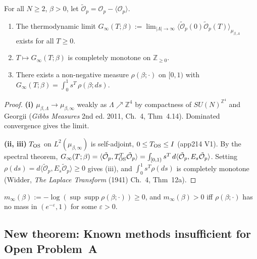 \begin{theorem}
\label{thm:inf_vol_cm}
For all $N\ge 2$, $\beta>0$, let
$\tilde{\mathcal{O}}_p=\mathcal{O}_p-\langle\mathcal{O}_p\rangle$.
\begin{enumerate}
\item[\rm(i)] The thermodynamic limit
  $G_\infty(T;\beta):=\lim_{|\Lambda|\to\infty}
  \langle\tilde{\mathcal{O}}_p(0)\tilde{\mathcal{O}}_p(T)\rangle_{\mu_{\beta,\Lambda}}$
  exists for all $T\ge 0$.
\item[\rm(ii)] $T\mapsto G_\infty(T;\beta)$ is completely monotone on $\mathbb{Z}_{\ge 0}$.
\item[\rm(iii)] There exists a non-negative measure $\rho(\beta;\cdot)$ on $[0,1)$ with
  $G_\infty(T;\beta)=\int_0^1 s^T\,\rho(\beta;ds)$.
\end{enumerate}
\end{theorem}
\begin{proof}
\textbf{(i)} $\mu_{\beta,\Lambda}\to\mu_{\beta,\infty}$ weakly as $\Lambda\nearrow\mathbb{Z}^4$
by compactness of $SU(N)^{\mathbb{Z}^4}$ and Georgii
(\textit{Gibbs Measures} 2nd ed. 2011, Ch.~4, Thm~4.14).
Dominated convergence gives the limit.

\textbf{(ii, iii)} $T_{\rm OS}$ on $L^2(\mu_{\beta,\infty})$ is self-adjoint,
$0\le T_{\rm OS}\le I$ (app214 V1).
By the spectral theorem,
$G_\infty(T;\beta)=\langle\tilde{\mathcal{O}}_p,T_{\rm OS}^T\tilde{\mathcal{O}}_p\rangle
=\int_{[0,1)} s^T\,d\langle\tilde{\mathcal{O}}_p,E_s\tilde{\mathcal{O}}_p\rangle$.
Setting $\rho(ds)=d\langle\tilde{\mathcal{O}}_p,E_s\tilde{\mathcal{O}}_p\rangle\ge 0$
gives (iii), and $\int_0^1 s^T\rho(ds)$ is completely monotone
(Widder, \textit{The Laplace Transform} (1941) Ch.~4, Thm~12a).
\end{proof}

\begin{corollary}
\label{cor:kl}
$m_\infty(\beta):=-\log(\sup\operatorname{supp}\rho(\beta;\cdot))\ge 0$,
and $m_\infty(\beta)>0$ iff $\rho(\beta;\cdot)$ has no mass in $(e^{-\varepsilon},1)$
for some $\varepsilon>0$.
\end{corollary}

\subsection{New theorem: Known methods insufficient for Open Problem~A}
\label{ssec:why_open}

